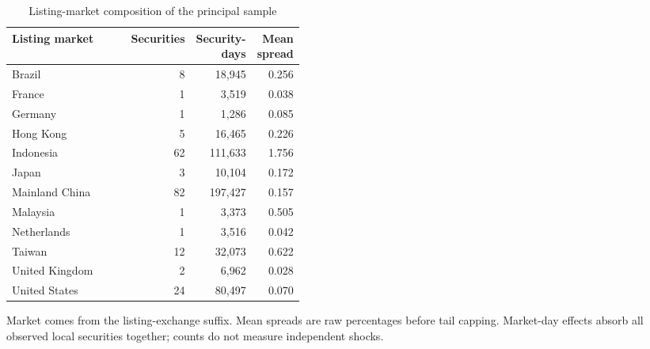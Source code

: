 \begin{table}[htbp]
\centering
\caption{Listing-market composition of the principal sample}
\label{tab:markets}
\begin{minipage}{\linewidth}
\small
\setlength{\tabcolsep}{4pt}
\begingroup\centering
\begin{tabular}{p{0.43\linewidth}rrr}
\toprule
Listing market & Securities & Security-days & Mean spread \\
\midrule
Brazil & 8 & 18,945 & 0.256 \\
France & 1 & 3,519 & 0.038 \\
Germany & 1 & 1,286 & 0.085 \\
Hong Kong & 5 & 16,465 & 0.226 \\
Indonesia & 62 & 111,633 & 1.756 \\
Japan & 3 & 10,104 & 0.172 \\
Mainland China & 82 & 197,427 & 0.157 \\
Malaysia & 1 & 3,373 & 0.505 \\
Netherlands & 1 & 3,516 & 0.042 \\
Taiwan & 12 & 32,073 & 0.622 \\
United Kingdom & 2 & 6,962 & 0.028 \\
United States & 24 & 80,497 & 0.070 \\
\bottomrule
\end{tabular}\par\endgroup
\par\vspace{0.5em}\footnotesize Market comes from the listing-exchange suffix. Mean spreads are raw percentages before tail capping. Market-day effects absorb all observed local securities together; counts do not measure independent shocks.
\end{minipage}
\end{table}
